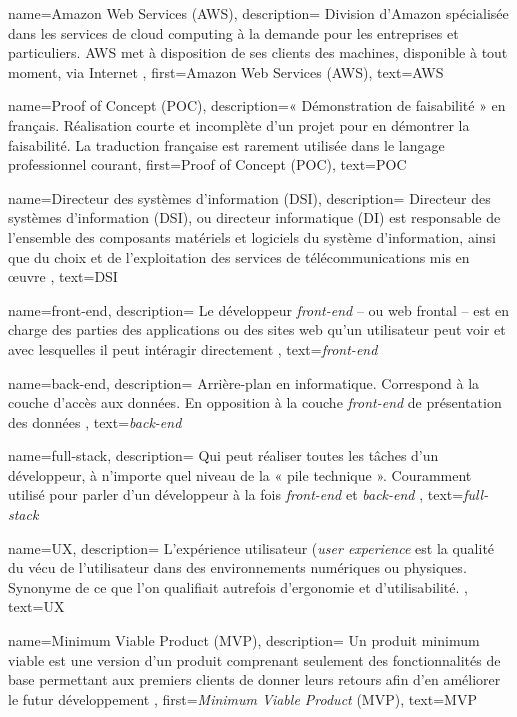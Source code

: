 {
    name={Amazon Web Services (\textsc{AWS})},
    description={
Division d'Amazon spécialisée dans les services de cloud computing à la demande pour les entreprises et particuliers. AWS met à disposition de ses clients des machines, disponible à tout moment, via Internet
    },
    first={Amazon Web Services (\textsc{AWS})},
    text={\textsc{AWS}}
}


{
    name={Proof of Concept (\textsc{POC})},
    description={« Démonstration de faisabilité » en français. Réalisation courte et incomplète d'un projet pour en démontrer la faisabilité. La traduction française est rarement utilisée dans le langage professionnel courant},
    first={Proof of Concept (\textsc{POC})},
    text={\textsc{POC}}
}

{
    name={Directeur des systèmes d'information (\textsc{DSI})},
    description={
Directeur des systèmes d'information (DSI), ou directeur informatique (DI) est responsable de l'ensemble des composants matériels et logiciels du système d'information, ainsi que du choix et de l'exploitation des services de télécommunications mis en œuvre
},
    text={\textsc{DSI}}
}

{
    name={front-end},
	description={
Le développeur \textit{front-end} -- ou web frontal -- est en charge des parties des applications ou des sites web qu'un utilisateur peut voir et avec lesquelles il peut intéragir directement 
	},
	text={\textit{front-end}}
}

{
    name={back-end},
	description={
\og Arrière-plan \fg en informatique. Correspond à la couche d'accès aux données. En opposition à la couche \textit{front-end} de \og présentation \fg des données
	},
	text={\textit{back-end}}
}

{
    name={full-stack},
	description={
Qui peut réaliser toutes les tâches d’un développeur, à n’importe quel niveau de la « pile technique ». Couramment utilisé pour parler d'un développeur à la fois \textit{front-end} et \textit{back-end}
	},
	text={\textit{full-stack}}
}

{
    name={UX},
	description={
L'expérience utilisateur (\textit{user experience} est la qualité du vécu de l'utilisateur dans des environnements numériques ou physiques. Synonyme de ce que l'on qualifiait autrefois d'ergonomie et d'utilisabilité.
	},
	text={\textsc{UX}}
}


{
    name={Minimum Viable Product (\textsc{MVP})},
    description={
    Un produit minimum viable est une version d'un produit comprenant seulement des fonctionnalités de base permettant aux premiers clients de donner leurs retours afin d'en améliorer le futur développement
    },
    first={\textit{Minimum Viable Product} (\textsc{MVP})},
    text={\textsc{MVP}}
}